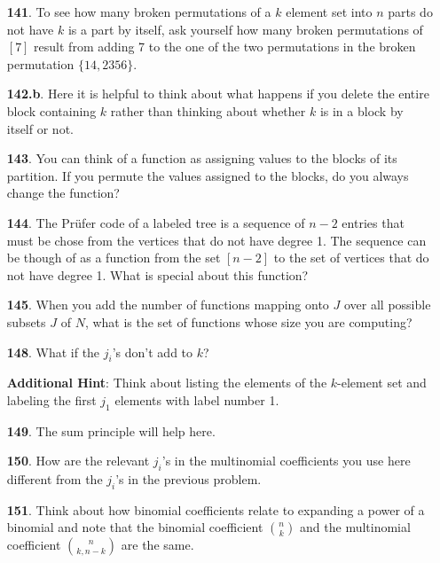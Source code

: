 \documentclass[10pt,]{book}
\theoremstyle{plain}
\theoremstyle{definition}
\theoremstyle{definition}
\numberwithin{equation}{chapter}
\begin{document}
\begin{itemize}[itemsep=1em]
\item[\textbf{141}.]To see how many broken permutations of a \(k\) element set into \(n\) parts do not have \(k\) is a part by itself, ask yourself how many broken permutations of \([7]\) result from adding 7 to the one of the two permutations in the broken permutation \(\{14, 2356\}\).%

\item[\textbf{142.b}.]Here it is helpful to think about what happens if you delete the entire block containing \(k\) rather than thinking about whether \(k\) is in a block by itself or not.%

\item[\textbf{143}.]You can think of a function as assigning values to the blocks of its partition. If you permute the values assigned to the blocks, do you always change the function?%

\item[\textbf{144}.]The Prüfer code of a labeled tree is a sequence of \(n-2\) entries that must be chose from the vertices that do not have degree 1. The sequence can be though of as a function from the set \([n-2]\) to the set of vertices that do not have degree 1. What is special about this function?%

\item[\textbf{145}.]When you add the number of functions mapping onto \(J\) over all possible subsets \(J\) of \(N\), what is the set of functions whose size you are computing?%

\item[\textbf{148}.]What if the \(j_i\)'s don't add to \(k\)?%

\par\smallskip
\noindent\textbf{Additional Hint}: Think about listing the elements of the \(k\)-element set and labeling the first \(j_1\) elements with label number 1.%

\item[\textbf{149}.]The sum principle will help here.%

\item[\textbf{150}.]How are the relevant \(j_i\)'s in the multinomial coefficients you use here different from the \(j_i\)'s in the previous problem.%

\item[\textbf{151}.]Think about how binomial coefficients relate to expanding a power of a binomial and note that the binomial coefficient \(\binom{n}{k}\) and the multinomial coefficient \(\binom{n}{k,n-k}\) are the same.%


\end{itemize}
\end{document}
